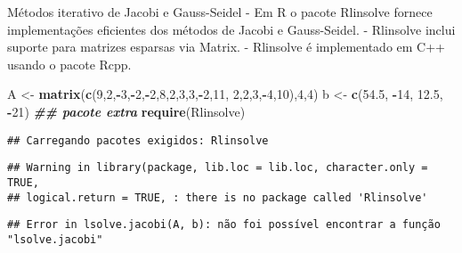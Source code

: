\documentclass[
]{article}
\newenvironment{Shaded}{\begin{snugshade}}{\end{snugshade}}
\newcommand{\DecValTok}[1]{\textcolor[rgb]{0.00,0.00,0.81}{#1}}
\newcommand{\DocumentationTok}[1]{\textcolor[rgb]{0.56,0.35,0.01}{\textbf{\textit{#1}}}}
\newcommand{\FloatTok}[1]{\textcolor[rgb]{0.00,0.00,0.81}{#1}}
\newcommand{\FunctionTok}[1]{\textcolor[rgb]{0.13,0.29,0.53}{\textbf{#1}}}
\newcommand{\NormalTok}[1]{#1}
\newcommand{\OtherTok}[1]{\textcolor[rgb]{0.56,0.35,0.01}{#1}}
\newcommand{\SpecialCharTok}[1]{\textcolor[rgb]{0.81,0.36,0.00}{\textbf{#1}}}
\begin{document}
Métodos iterativo de Jacobi e Gauss-Seidel - Em R o pacote Rlinsolve
fornece implementações eficientes dos métodos de Jacobi e Gauss-Seidel.
- Rlinsolve inclui suporte para matrizes esparsas via Matrix. -
Rlinsolve é implementado em C++ usando o pacote Rcpp.

\begin{Shaded}
\begin{Highlighting}[]
\NormalTok{A }\OtherTok{\textless{}{-}} \FunctionTok{matrix}\NormalTok{(}\FunctionTok{c}\NormalTok{(}\DecValTok{9}\NormalTok{,}\DecValTok{2}\NormalTok{,}\SpecialCharTok{{-}}\DecValTok{3}\NormalTok{,}\SpecialCharTok{{-}}\DecValTok{2}\NormalTok{,}\SpecialCharTok{{-}}\DecValTok{2}\NormalTok{,}\DecValTok{8}\NormalTok{,}\DecValTok{2}\NormalTok{,}\DecValTok{3}\NormalTok{,}\DecValTok{3}\NormalTok{,}\SpecialCharTok{{-}}\DecValTok{2}\NormalTok{,}\DecValTok{11}\NormalTok{,}
\DecValTok{2}\NormalTok{,}\DecValTok{2}\NormalTok{,}\DecValTok{3}\NormalTok{,}\SpecialCharTok{{-}}\DecValTok{4}\NormalTok{,}\DecValTok{10}\NormalTok{),}\DecValTok{4}\NormalTok{,}\DecValTok{4}\NormalTok{)}
\NormalTok{b }\OtherTok{\textless{}{-}} \FunctionTok{c}\NormalTok{(}\FloatTok{54.5}\NormalTok{, }\SpecialCharTok{{-}}\DecValTok{14}\NormalTok{, }\FloatTok{12.5}\NormalTok{, }\SpecialCharTok{{-}}\DecValTok{21}\NormalTok{)}
\DocumentationTok{\#\# pacote extra}
\FunctionTok{require}\NormalTok{(Rlinsolve)}
\end{Highlighting}
\end{Shaded}

\begin{verbatim}
## Carregando pacotes exigidos: Rlinsolve
\end{verbatim}

\begin{verbatim}
## Warning in library(package, lib.loc = lib.loc, character.only = TRUE,
## logical.return = TRUE, : there is no package called 'Rlinsolve'
\end{verbatim}

\begin{Shaded}
\end{Shaded}

\begin{verbatim}
## Error in lsolve.jacobi(A, b): não foi possível encontrar a função "lsolve.jacobi"
\end{verbatim}
\end{document}
